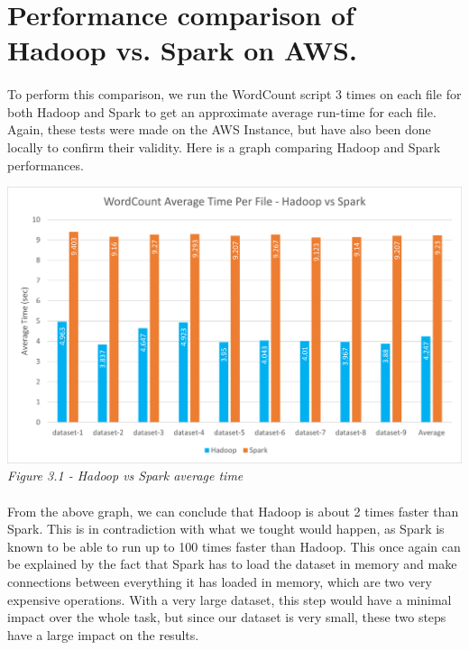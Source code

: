 \pagebreak
\section{Performance comparison of Hadoop vs. Spark on AWS.} \label{T3}
\paragraph{}To perform this comparison, we run the WordCount script 3 times on each file for both Hadoop and Spark to get an approximate average run-time for each file. Again, these tests were made on the AWS Instance, but have also been done locally to confirm their validity. Here is a graph comparing Hadoop and Spark performances.\\
\begin{center}
\includegraphics[width=14cm]{Resources/hadoop_vs_spark.png}\\
\emph{Figure 3.1 - Hadoop vs Spark average time}
\end{center}
\paragraph{}From the above graph, we can conclude that Hadoop is about 2 times faster than Spark. This is in contradiction with what we tought would happen, as Spark is known to be able to run up to 100 times faster than Hadoop. This once again can be explained by the fact that Spark has to load the dataset in memory and make connections between everything it has loaded in memory, which are two very expensive operations. With a very large dataset, this step would have a minimal impact over the whole task, but since our dataset is very small, these two steps have a large impact on the results.
